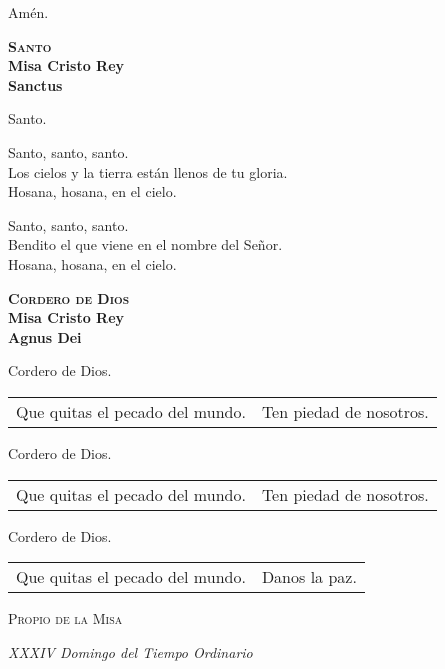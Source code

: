 \documentclass[letterpaper]{report}
\begin{document}
    Am\'en.
    \clearpage

    \begin{center}
        {\scshape \Huge {\bfseries Santo}} \\
        {\LARGE {\bfseries Misa Cristo Rey}} \\
        {\Large {\bfseries Sanctus}}
    \end{center}
    
    \LARGE Santo.
    
    Santo, santo, santo. \\
    Los cielos y la tierra est\'an llenos de tu gloria.\\
    Hosana, hosana, en el cielo.

    Santo, santo, santo. \\
    Bendito el que viene en el nombre del Se\~nor. \\
    Hosana, hosana, en el cielo.
    \clearpage

    \begin{center}
        {\scshape \Huge {\bfseries Cordero de Dios}} \\
        {\LARGE {\bfseries Misa Cristo Rey}} \\
        {\Large {\bfseries Agnus Dei}}
    \end{center}
    
    \LARGE Cordero de Dios.
    
    \LARGE \begin{tabular}{ll}
        Que quitas el pecado del mundo.& Ten piedad de nosotros.
    \end{tabular}
    
    \LARGE Cordero de Dios.
    
    \LARGE \begin{tabular}{ll}
        Que quitas el pecado del mundo.& Ten piedad de nosotros.
    \end{tabular}
    
    \LARGE Cordero de Dios.
    
    \LARGE \begin{tabular}{ll}
        Que quitas el pecado del mundo.& Danos la paz.
    \end{tabular}
    \clearpage

    \begin{titlepage}
        \centering
        \vspace*{8cm}
        { \scshape \Huge Propio de la Misa \par}
        \vspace{1cm}
        { \itshape \Large XXXIV Domingo del Tiempo Ordinario \par}
        \vfill
    \end{titlepage}
    \clearpage
\end{document}
